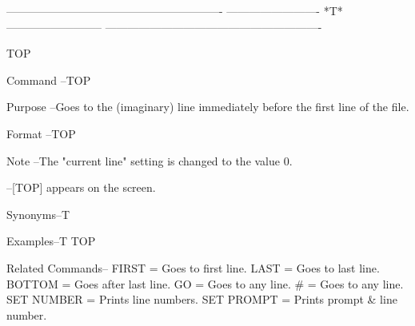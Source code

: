  
 
 
 
 
 
 
 
 
 
 
 
 
 
 
 
 
 
 
 
 
 
 
 
 
 
 
 
 
 
 
 
 
 
 
 
 
 
 
 
 
 
 
 
 
 
 
 
 
 
 
 
 
 
 
 
 
 
 
 
 
 
 
 
 
 
 
 
 
 
 
 
 
 
 
 
 
 
 
----------------------------------------------------------
-------------------------  *T*  --------------------------
----------------------------------------------------------
 
TOP
 
Command --TOP
 
Purpose --Goes to the (imaginary) line immediately
          before the first line of the file.
 
Format  --TOP
 
Note    --The "current line" setting is changed
          to the value 0.
 
        --[TOP]     appears on the screen.
 
Synonyms--T
 
Examples--T
          TOP
 
Related Commands--
          FIRST           = Goes to first line.
          LAST            = Goes to last line.
          BOTTOM          = Goes after last line.
          GO              = Goes to any line.
          #               = Goes to any line.
          SET NUMBER      = Prints line numbers.
          SET PROMPT      = Prints prompt & line number.
 
